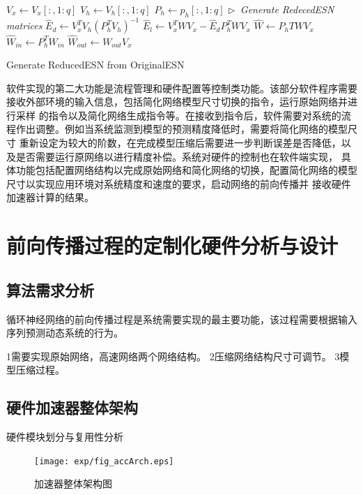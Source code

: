 \begin{algorithm}

 $V_x \leftarrow V_x[:,1:q]$	\;
 $V_h \leftarrow V_h[:,1:q]$	\;
 $P_h \leftarrow p_h[:,1:q]$	\;
 \emph{$\triangleright$\ Generate RedecedESN matrices	}	\;
$\widehat{E}_d \leftarrow V_x^T V_h (P_h^T V_h)^{-1}$	\;
$\widehat{E}_l \leftarrow V_x^T W V_x - \widehat{E}_d P_h^T W V_x$	\;
$\widehat{W} \leftarrow P_hT W V_x$	\;
$\widehat{W}_{in} \leftarrow P_h^T W_{in}$	\;
$\widehat{W}_{out} \leftarrow W_{out}V_x$	\;

 \caption{Generate ReducedESN from OriginalESN}
 \label{alg:GenESN}
\end{algorithm}
软件实现的第二大功能是流程管理和硬件配置等控制类功能。该部分软件程序需要接收外部环境的输入信息，包括简化网络模型尺寸切换的指令，运行原始网络并进行采样
的指令以及简化网络生成指令等。在接收到指令后，软件需要对系统的流程作出调整。例如当系统监测到模型的预测精度降低时，需要将简化网络的模型尺寸
重新设定为较大的阶数，在完成模型压缩后需要进一步判断误差是否降低，以及是否需要运行原网络以进行精度补偿。系统对硬件的控制也在软件端实现，
具体功能包括配置网络结构以完成原始网络和简化网络的切换，配置简化网络的模型尺寸以实现应用环境对系统精度和速度的要求，启动网络的前向传播并
接收硬件加速器计算的结果。

\section{前向传播过程的定制化硬件分析与设计}
\subsection{算法需求分析}
循环神经网络的前向传播过程是系统需要实现的最主要功能，该过程需要根据输入序列预测动态系统的行为。

1需要实现原始网络，高速网络两个网络结构。
2压缩网络结构尺寸可调节。
3模型压缩过程。

\subsection{硬件加速器整体架构}
硬件模块划分与复用性分析
\begin{figure}
	\centering
	\texttt{[image: exp/fig\_accArch.eps]}
	\caption{加速器整体架构图}
	\label{fig:accArch}
\end{figure}
